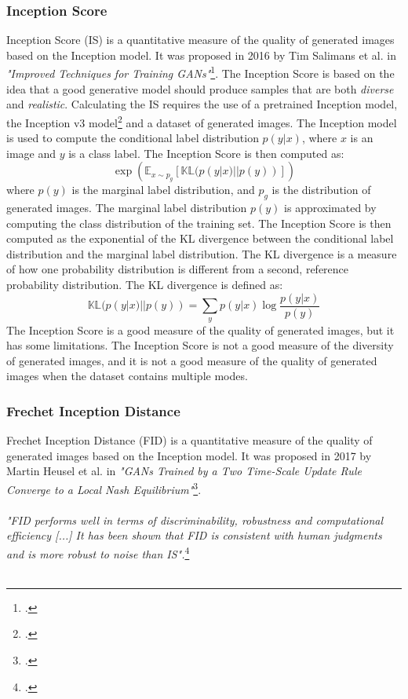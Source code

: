 \subsubsection{Inception Score}
\label{subsubsec:inception-score}
Inception Score (IS) is a quantitative measure of the quality of generated images based on the Inception model.
It was proposed in 2016 by Tim Salimans et al. in \emph{"Improved Techniques for Training GANs"}\footcite{paper:salimans2016improved}.
The Inception Score is based on the idea that a good generative model should produce samples that are both \emph{diverse} and \emph{realistic}.
Calculating the IS requires the use of a pretrained Inception model, the Inception v3 model\footcite{paper:inceptionv3} and a dataset of generated images.
The Inception model is used to compute the conditional label distribution $p(y|x)$, where $x$ is an image and $y$ is a class label.
The Inception Score is then computed as:
\begin{equation}
    \label{eq:inception-score}
    \exp \left( \mathbb{E}_{x \sim p_{g}} \left[ \mathbb{KL}(p(y|x) || p(y)) \right] \right)
\end{equation}
where $p(y)$ is the marginal label distribution, and $p_{g}$ is the distribution of generated images.
The marginal label distribution $p(y)$ is approximated by computing the class distribution of the training set.
The Inception Score is then computed as the exponential of the KL divergence between the conditional label distribution and the marginal label distribution.
The KL divergence is a measure of how one probability distribution is different from a second, reference probability distribution.
The KL divergence is defined as:
\begin{equation}
    \label{eq:kl-divergence}
    \mathbb{KL}(p(y|x) || p(y)) = \sum_{y} p(y|x) \log \frac{p(y|x)}{p(y)}
\end{equation}
The Inception Score is a good measure of the quality of generated images, but it has some limitations.
The Inception Score is not a good measure of the diversity of generated images, and it is not a good measure of the quality of generated images when the dataset contains multiple modes.
\subsubsection{Frechet Inception Distance}
\label{subsubsec:frechet-inception-distance}
Frechet Inception Distance (FID) is a quantitative measure of the quality of generated images based on the Inception model.
It was proposed in 2017 by Martin Heusel et al. in \emph{"GANs Trained by a Two Time-Scale Update Rule Converge to a Local Nash Equilibrium"}\footcite{paper:heusel2017gans}.\\\\
\emph{"FID performs well in terms of discriminability, robustness and computational efficiency [...] It has been shown that FID is consistent with human judgments and is more robust to noise than IS".}\footcite{paper:ganeval}\\\\
